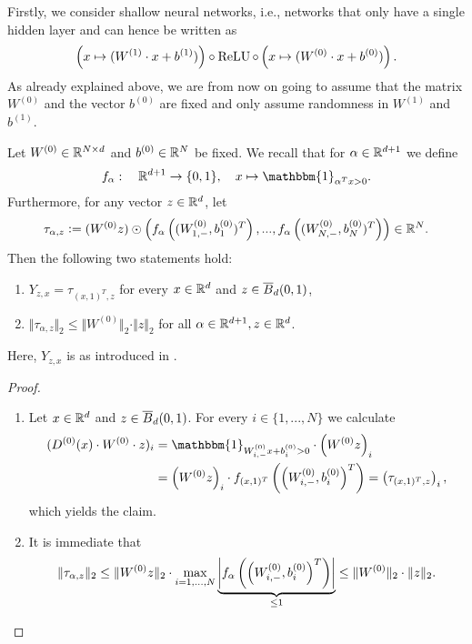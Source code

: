 

\label{sec:shallow}
Firstly, we consider shallow neural networks, i.e., networks that only have a single hidden layer and can hence be written as
\begin{equation*}
\left(x \mapsto (W^{(1)} \cdot x + b^{(1)})\right) \circ \operatorname{ReLU} \circ \left( x \mapsto (W^{(0)}\cdot x + b^{(0)}) \right).
\end{equation*}
As already explained above, we are from now on going to assume that the matrix $W^{(0)}$ and the vector $b^{(0)}$ are fixed and only assume randomness in $W^{(1)}$ and $b^{(1)}$.
\begin{lemma} \label{lem:scalarproduct_alternative_form}
Let $W^{(0)} \in \mathbb{R}^{N \times d}$ and $b^{(0)} \in \mathbb{R}^N$ be fixed. We recall that for $\alpha \in \mathbb{R}^{d+1}$ we define
\begin{equation*}
f_\alpha: \quad \RR^{d+1} \to \{0,1\}, \quad x \mapsto \mathbbm{1}_{\alpha^Tx > 0}.
\end{equation*}
Furthermore, for any vector $z \in \mathbb{R}^{d}$, let
\begin{equation*}
\tau_{\alpha, z} \mathrel{\mathop:}= (W^{(0)}z) \odot \left( f_\alpha\left((W^{(0)}_{1,-}, b^{(0)}_1)^T\right) , ..., f_\alpha \left((W^{(0)}_{N,-}, b^{(0)}_N)^T\right)\right) \in \mathbb{R}^N.
\end{equation*}
Then the following two statements hold:
\begin{enumerate}
\item{$Y_{z,x}=  \tau_{(x,1)^T, z}$ for every $x \in \mathbb{R}^d$ and $z \in \overline{B}_d(0,1)$,}
\item{\label{item:lem_2}$\Vert \tau_{\alpha,z} \Vert_2 \leq \Vert W^{(0)} \Vert_2 \cdot \Vert z \Vert_2$ for all $\alpha \in \mathbb{R}^{d+1}, z \in \mathbb{R}^d$.}
\end{enumerate}
Here, $Y_{z,x}$ is as introduced in .
\end{lemma}

\begin{proof}
\leavevmode
\begin{enumerate}
\item{ Let $x \in \mathbb{R}^d$ and $z \in \overline{B}_d(0,1)$. For every $i \in \{1,...,N\}$ we calculate
\begin{align*}
(D^{(0)}(x) \cdot W^{(0)} \cdot z)_i &= \mathbbm{1}_{W^{(0)}_{i,-} x + b^{(0)}_i > 0} \cdot \left(W^{(0)}z\right)_i \\
&= \left(W^{(0)}z\right)_i \cdot f_{(x,1)^T}\left(\left(W^{(0)}_{i,-}, b^{(0)}_i\right)^T\right) = \left(\tau_{(x,1)^T,z}\right)_i,
\end{align*}
which yields the claim.}
\item{It is immediate that
\begin{equation*}
\Vert \tau_{\alpha, z} \Vert_2 \leq \Vert W^{(0)}z \Vert_2 \cdot \underset{i=1,...,N}{\max} \underbrace{\left\lvert f_\alpha\left(\left(W^{(0)}_{i,-}, b^{(0)}_i\right)^T\right)\right\rvert}_{\leq 1} \leq \Vert W^{(0)} \Vert_2 \cdot \Vert z \Vert_2. \qedhere
\end{equation*}
}
\end{enumerate}
\end{proof}

